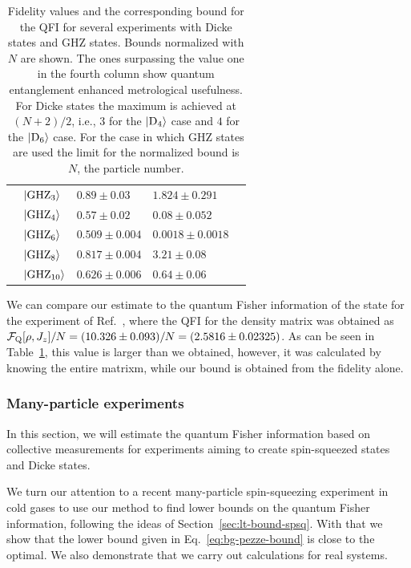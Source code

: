 \begin{table}
\begin{center}
\begin{tabular}{| l | l | l | l | l |}
      & $\vert{\textnormal{GHZ}_{3}}\rangle$  & $0.89\pm0.03$   & $1.824\pm0.291$ & \cite{Leibfried2004} \\
      & $\vert{\textnormal{GHZ}_{4}}\rangle$  & $0.57\pm0.02$   & $0.08\pm0.052$  & \cite{Sackett2000}\\
      & $\vert{\textnormal{GHZ}_{6}}\rangle$  & $0.509\pm0.004$ & $0.0018\pm0.0018$ & \cite{Leibfried2005} \\
      & $\vert{\textnormal{GHZ}_{8}}\rangle$  & $0.817\pm0.004$ & $3.21\pm0.08$ & \cite{Monz2011} \\
      & $\vert{\textnormal{GHZ}_{10}}\rangle$ & $0.626\pm0.006$ & $0.64\pm0.06$ & \cite{Monz2011} \\ \hline
    \end{tabular}
  \end{center}
  \caption[Bounds on QFI for experimental data when fidelities are measured]{
  Fidelity values and the corresponding bound for the QFI for several experiments with Dicke states and GHZ states.
  Bounds normalized with $N$ are shown.
  The ones surpassing the value one in the fourth column show quantum entanglement enhanced metrological usefulness.
  For Dicke states the maximum is achieved at $(N+2)/2$, i.e., $3$ for the $\vert{\ensuremath{\textnormal{D}_{4}}}\rangle$ case and $4$ for the $\vert{\ensuremath{\textnormal{D}_{6}}}\rangle$ case.
  For the case in which GHZ states are used the limit for the normalized bound is $N$, the particle number.}
  \label{tab:lt-results-for-fidelities}
\end{table}

We can compare our estimate to the quantum Fisher information of the state for the experiment of Ref.~\cite{Krischek2011}, where the QFI for the density matrix was obtained as $\mathcal{F}_{\textnormal{Q}}[{\textstyle \rho,J_z}]/N=(10.326\pm0.093)/N=(2.5816\pm0.02325)$.
As can be seen in Table~\ref{tab:lt-results-for-fidelities}, this value is larger than we obtained, however, it was calculated by knowing the entire matrixm, while our bound is obtained from the fidelity alone.

\subsubsection{Many-particle experiments}
\label{sec:lt-many-particle-experiments}

In this section, we will estimate the quantum Fisher information based on collective measurements for experiments aiming to create spin-squeezed states and Dicke states.


We turn our attention to a recent many-particle spin-squeezing experiment in cold gases to use our method to find lower bounds on the quantum Fisher information, following the ideas of Section~\ref{sec:lt-bound-spsq}.
With that we show that the lower bound given in Eq.~\eqref{eq:bg-pezze-bound} is close to the optimal.
We also demonstrate that we carry out calculations for real systems.

